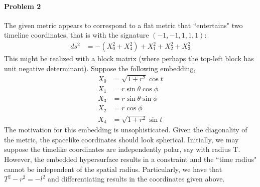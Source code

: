 \documentclass[10pt]{scrartcl}
\begin{document}
\paragraph{Problem 2} The given metric appears to correspond to a flat metric that ``entertains" two timeline coordinates, that is with the signature $(-1, -1, 1, 1, 1)$:
\begin{align}
ds^2 &= -\left(X_0^2 + X_4^2\right) + X_1^2 + X_2^2 + X_3^2	
\end{align}
This might be realized with a block matrix (where perhaps the top-left block has unit negative determinant). Suppose the following embedding,
\begin{align}
	X_0 &= \sqrt{1+r^2}\cos{t} \\
	X_1 &= r\sin{\theta}\cos{\phi}\\
	X_3 &= r\sin{\theta}\sin{\phi}\\
	X_2 &= r\cos{\phi}\\
	X_4	&= \sqrt{1+r^2}\sin{t}
\end{align}
The motivation for this embedding is unsophisticated. Given the diagonality of the metric, the spacelike coordinates should look spherical. Initially, we may suppose the timelike coordinates are independently polar, say with radius T.  However, the embedded hypersurface results in a constraint and the ``time radius" cannot be independent of the spatial radius. Particularly, we have that $T^2 - r^2 = - l^2$ and differentiating results in the coordinates given above.  
\end{document}
